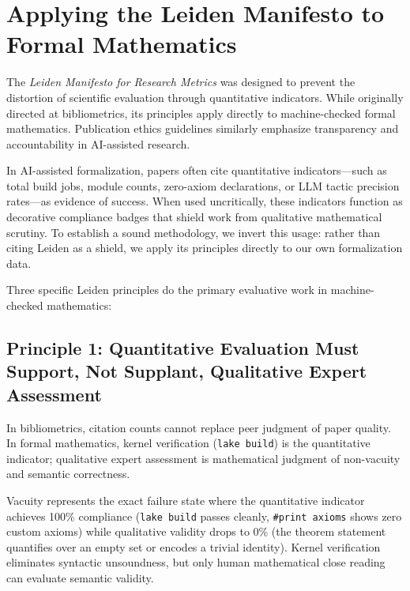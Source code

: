 \documentclass[11pt,a4paper]{article}
\theoremstyle{definition}
\theoremstyle{remark}
\begin{document}
\section{Applying the Leiden Manifesto to Formal Mathematics}
\label{sec:leiden}

The \emph{Leiden Manifesto for Research Metrics} \cite{Hicks2015} was designed to prevent the distortion of scientific evaluation through quantitative indicators. While originally directed at bibliometrics, its principles apply directly to machine-checked formal mathematics. Publication ethics guidelines \cite{COPE2023} similarly emphasize transparency and accountability in AI-assisted research.

In AI-assisted formalization, papers often cite quantitative indicators---such as total build jobs, module counts, zero-axiom declarations, or LLM tactic precision rates---as evidence of success. When used uncritically, these indicators function as decorative compliance badges that shield work from qualitative mathematical scrutiny. To establish a sound methodology, we invert this usage: rather than citing Leiden as a shield, we apply its principles directly to our own formalization data.

Three specific Leiden principles do the primary evaluative work in machine-checked mathematics:

\subsection{Principle 1: Quantitative Evaluation Must Support, Not Supplant, Qualitative Expert Assessment}

In bibliometrics, citation counts cannot replace peer judgment of paper quality. In formal mathematics, kernel verification (\texttt{lake build}) is the quantitative indicator; qualitative expert assessment is mathematical judgment of non-vacuity and semantic correctness.

Vacuity represents the exact failure state where the quantitative indicator achieves 100\% compliance (\texttt{lake build} passes cleanly, \texttt{\#print axioms} shows zero custom axioms) while qualitative validity drops to 0\% (the theorem statement quantifies over an empty set or encodes a trivial identity). Kernel verification eliminates syntactic unsoundness, but only human mathematical close reading can evaluate semantic validity.
\end{document}
